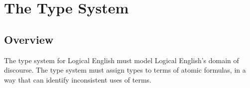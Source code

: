 \documentclass[../main.tex]{subfiles}
\begin{document}
\chapter{The Type System}
\section{Overview}
\label{section:type-system-requirements}
The type system for Logical English must model Logical English's domain of discourse. The type system must assign types to terms of atomic formulas, in a way that can identify inconsistent uses of terms. 


\end{document}
